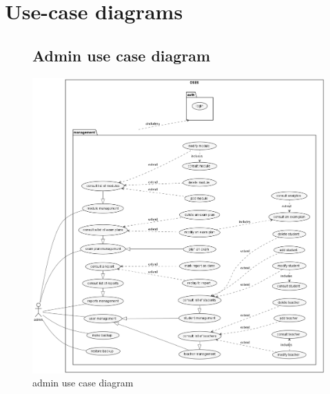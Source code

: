 \documentclass[]{uc2pfecaneva}
\begin{document}
    \raggedright\section{Use-case diagrams}
    \begin{figure}
        \subsection{Admin use case diagram}
        \centering
        \includegraphics[width=\textwidth]{images/admin_UCD}
        \caption{admin use case diagram}
    \end{figure}
    \clearpage
\end{document}
